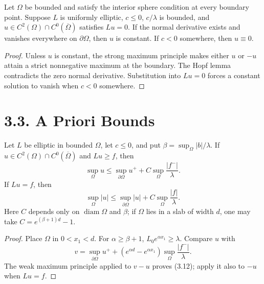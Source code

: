 \begin{theorem}\label{gt-ch3-neumann}
Let $\Omega$ be bounded and satisfy the interior sphere condition at every
boundary point. Suppose $L$ is uniformly elliptic, $c\leq0$, $c/\lambda$ is
bounded, and
$u\in C^2(\Omega)\cap C^0(\overline\Omega)$ satisfies $Lu=0$. If the normal
derivative exists and vanishes everywhere on $\partial\Omega$, then $u$ is
constant. If $c<0$ somewhere, then $u\equiv0$.
\end{theorem}
\begin{proof}
\sketch Unless $u$ is constant, the strong maximum principle makes either
$u$ or $-u$ attain a strict nonnegative maximum at the boundary. The Hopf
lemma contradicts the zero normal derivative. Substitution into $Lu=0$
forces a constant solution to vanish when $c<0$ somewhere.
\end{proof}

\section*{3.3. A Priori Bounds}

\begin{theorem}\label{gt-ch3-apriori}
Let $L$ be elliptic in bounded $\Omega$, let $c\leq0$, and put
$\beta=\sup_\Omega|b|/\lambda$. If
$u\in C^2(\Omega)\cap C^0(\overline\Omega)$ and $Lu\geq f$, then
\begin{equation}
\tag{3.12}
\sup_\Omega u\leq\sup_{\partial\Omega}u^+
+C\sup_\Omega\frac{|f^-|}{\lambda}.
\end{equation}
If $Lu=f$, then
\[
\sup_\Omega|u|\leq\sup_{\partial\Omega}|u|
+C\sup_\Omega\frac{|f|}{\lambda}.
\]
Here $C$ depends only on $\operatorname{diam}\Omega$ and $\beta$; if
$\Omega$ lies in a slab of width $d$, one may take
$C=e^{(\beta+1)d}-1$.
\end{theorem}
\begin{proof}
\sketch Place $\Omega$ in $0<x_1<d$. For $\alpha\geq\beta+1$,
$L_0e^{\alpha x_1}\geq\lambda$. Compare $u$ with
\[
v=\sup_{\partial\Omega}u^+
+(e^{\alpha d}-e^{\alpha x_1})
 \sup_\Omega\frac{|f^-|}{\lambda}.
\]
The weak maximum principle applied to $v-u$ proves (3.12); apply it also to
$-u$ when $Lu=f$.
\end{proof}

